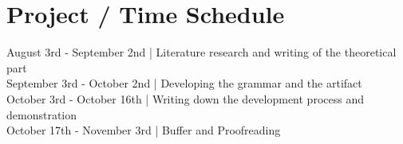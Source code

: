 \section{Project / Time Schedule}
August 3rd - September 2nd | Literature research and writing of the theoretical part\\
September 3rd - October 2nd | Developing the grammar and the artifact\\
October 3rd - October 16th | Writing down the development process and demonstration\\
October 17th - November 3rd | Buffer and Proofreading
